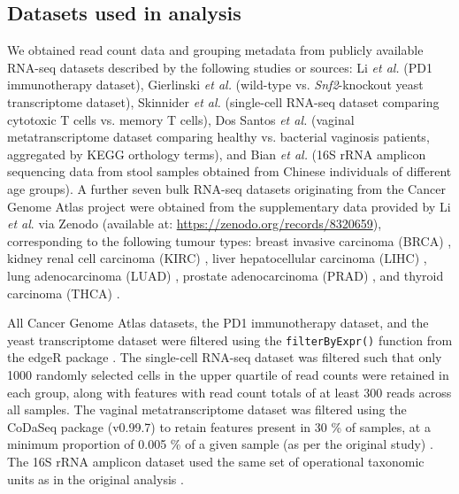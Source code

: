 \documentclass[10pt,letterpaper]{article}
\begin{document}
\subsection*{Datasets used in analysis}
We obtained read count data and grouping metadata from publicly available RNA-seq datasets described by the following studies or sources: Li \textit{et al.} \cite{li_exaggerated_2022} (PD1 immunotherapy dataset), Gierlinski \textit{et al.} \cite{gierlinski_statistical_2015} (wild-type vs. \textit{Snf2}-knockout yeast transcriptome dataset), Skinnider \textit{et al.} \cite{skinnider_evaluating_2019} (single-cell RNA-seq dataset comparing cytotoxic T cells vs. memory T cells), Dos Santos \textit{et al.} \cite{dos_santos_vaginal_2024} (vaginal metatranscriptome dataset comparing healthy vs. bacterial vaginosis patients, aggregated by KEGG orthology terms), and Bian \textit{et al.} \cite{bian_gut_2017} (16S rRNA amplicon sequencing data from stool samples obtained from Chinese individuals of different age groups). A further seven bulk RNA-seq datasets originating from the Cancer Genome Atlas project \cite{weinstein_cancer_2013} were obtained from the supplementary data provided by Li \textit{et al}. via Zenodo \cite{li_supplement_2022} (available at: \url{https://zenodo.org/records/8320659}), corresponding to the following tumour types: breast invasive carcinoma (BRCA) \cite{tcga_brca_2012,tcga_brca_2015}, kidney renal cell carcinoma (KIRC) \cite{tcga_kirc_2013}, liver hepatocellular carcinoma (LIHC) \cite{tcga_lihc_2017}, lung adenocarcinoma (LUAD) \cite{tcga_luad_2016}, prostate adenocarcinoma (PRAD) \cite{tcga_prad_2015}, and thyroid carcinoma (THCA) \cite{tcga_thca_2014}.

All Cancer Genome Atlas datasets, the PD1 immunotherapy dataset, and the yeast transcriptome dataset were filtered using the \texttt{filterByExpr()} function from the edgeR package \cite{robinson_edger_2010}. The single-cell RNA-seq dataset was filtered such that only 1000 randomly selected cells in the upper quartile of read counts were retained in each group, along with features with read count totals of at least 300 reads across all samples. The vaginal metatranscriptome dataset was filtered using the CoDaSeq package (v0.99.7) \cite{gloor_codaseq} to retain features present in 30 \% of samples, at a minimum proportion of 0.005 \% of a given sample (as per the original study) \cite{dos_santos_vaginal_2024}. The 16S rRNA amplicon dataset used the same set of operational taxonomic units as in the original analysis \cite{bian_gut_2017}.
\end{document}
